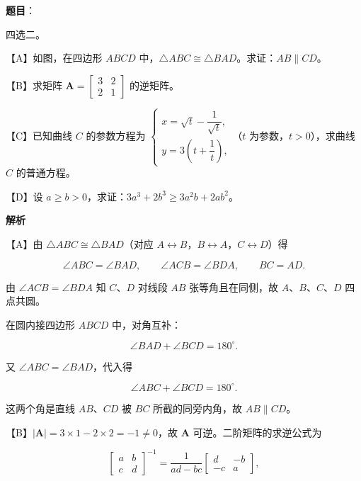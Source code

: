 \begin{answer}

\textbf{题目}：

四选二。

【A】如图，在四边形 $ABCD$ 中，$\triangle ABC\cong\triangle BAD$。求证：$AB\parallel CD$。
\nopagebreak[4]
\begin{center}\end{center}
\nopagebreak[4]
【B】求矩阵 $\boldsymbol A=\begin{bmatrix}3&2\\2&1\end{bmatrix}$ 的逆矩阵。

【C】已知曲线 $C$ 的参数方程为 $\begin{cases}x=\sqrt t-\dfrac1{\sqrt t},\\ y=3\left(t+\dfrac1t\right),\end{cases}$（$t$ 为参数，$t>0$），求曲线 $C$ 的普通方程。

【D】设 $a\geqslant b>0$，求证：$3a^3+2b^3\geqslant3a^2b+2ab^2$。

\textbf{解析}

【A】由 $\triangle ABC\cong\triangle BAD$（对应 $A\leftrightarrow B$，$B\leftrightarrow A$，$C\leftrightarrow D$）得

\nopagebreak[4]
\[\angle ABC=\angle BAD,\qquad \angle ACB=\angle BDA,\qquad BC=AD .\]

由 $\angle ACB=\angle BDA$ 知 $C$、$D$ 对线段 $AB$ 张等角且在同侧，故 $A$、$B$、$C$、$D$ 四点共圆。

在圆内接四边形 $ABCD$ 中，对角互补：

\nopagebreak[4]
\[\angle BAD+\angle BCD=180^\circ .\]

又 $\angle ABC=\angle BAD$，代入得

\nopagebreak[4]
\[\angle ABC+\angle BCD=180^\circ .\]

这两个角是直线 $AB$、$CD$ 被 $BC$ 所截的同旁内角，故 $AB\parallel CD$。

【B】$|\boldsymbol A|=3\times1-2\times2=-1\neq0$，故 $\boldsymbol A$ 可逆。二阶矩阵的求逆公式为

\nopagebreak[4]
\[\begin{bmatrix}a&b\\c&d\end{bmatrix}^{-1}=\frac1{ad-bc}\begin{bmatrix}d&-b\\-c&a\end{bmatrix},\]


\end{answer}
